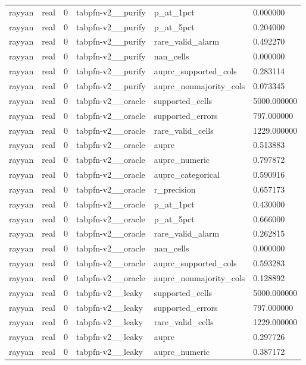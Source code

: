 \begin{tabular}{llllll}
rayyan & real & 0 & tabpfn-v2\_\_purify & p\_at\_1pct & 0.000000 \\
rayyan & real & 0 & tabpfn-v2\_\_purify & p\_at\_5pct & 0.204000 \\
rayyan & real & 0 & tabpfn-v2\_\_purify & rare\_valid\_alarm & 0.492270 \\
rayyan & real & 0 & tabpfn-v2\_\_purify & nan\_cells & 0.000000 \\
rayyan & real & 0 & tabpfn-v2\_\_purify & auprc\_supported\_cols & 0.283114 \\
rayyan & real & 0 & tabpfn-v2\_\_purify & auprc\_nonmajority\_cols & 0.073345 \\
rayyan & real & 0 & tabpfn-v2\_\_oracle & supported\_cells & 5000.000000 \\
rayyan & real & 0 & tabpfn-v2\_\_oracle & supported\_errors & 797.000000 \\
rayyan & real & 0 & tabpfn-v2\_\_oracle & rare\_valid\_cells & 1229.000000 \\
rayyan & real & 0 & tabpfn-v2\_\_oracle & auprc & 0.513883 \\
rayyan & real & 0 & tabpfn-v2\_\_oracle & auprc\_numeric & 0.797872 \\
rayyan & real & 0 & tabpfn-v2\_\_oracle & auprc\_categorical & 0.590916 \\
rayyan & real & 0 & tabpfn-v2\_\_oracle & r\_precision & 0.657173 \\
rayyan & real & 0 & tabpfn-v2\_\_oracle & p\_at\_1pct & 0.430000 \\
rayyan & real & 0 & tabpfn-v2\_\_oracle & p\_at\_5pct & 0.666000 \\
rayyan & real & 0 & tabpfn-v2\_\_oracle & rare\_valid\_alarm & 0.262815 \\
rayyan & real & 0 & tabpfn-v2\_\_oracle & nan\_cells & 0.000000 \\
rayyan & real & 0 & tabpfn-v2\_\_oracle & auprc\_supported\_cols & 0.593283 \\
rayyan & real & 0 & tabpfn-v2\_\_oracle & auprc\_nonmajority\_cols & 0.128892 \\
rayyan & real & 0 & tabpfn-v2\_\_leaky & supported\_cells & 5000.000000 \\
rayyan & real & 0 & tabpfn-v2\_\_leaky & supported\_errors & 797.000000 \\
rayyan & real & 0 & tabpfn-v2\_\_leaky & rare\_valid\_cells & 1229.000000 \\
rayyan & real & 0 & tabpfn-v2\_\_leaky & auprc & 0.297726 \\
rayyan & real & 0 & tabpfn-v2\_\_leaky & auprc\_numeric & 0.387172 \\

\end{tabular}
